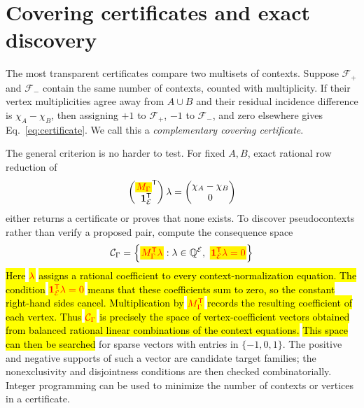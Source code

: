 \documentclass[
  twocolumn,
  aps,
  pra,
  floatfix,
  amsmath,amssymb,
  longbibliography
]{revtex4-2}
\theoremstyle{definition}
\theoremstyle{remark}
\newcommand{\E}{\mathcal E}
\newcommand{\one}{\mathbf 1}
\newcommand{\corr}[1]{{\color{red}\hl{#1}}}
\newcommand{\corrmath}[1]{\begingroup\setlength{\fboxsep}{1pt}\colorbox{yellow}{\ensuremath{\color{red}#1}}\endgroup}
\begin{document}
\section{Covering certificates and exact discovery}
\label{sec:coverings}

The most transparent certificates compare two multisets of contexts.
Suppose $\mathcal F_+$ and $\mathcal F_-$ contain the same number of
contexts, counted with multiplicity.  If their vertex multiplicities agree
away from $A\cup B$ and their residual incidence difference is
$\chi_A-\chi_B$, then assigning $+1$ to $\mathcal F_+$, $-1$ to
$\mathcal F_-$, and zero elsewhere gives Eq.~\eqref{eq:certificate}.  We call
this a \emph{complementary covering certificate}.

The general criterion is no harder to test.  For fixed $A,B$, exact rational
row reduction of
\begin{equation}
 \begin{pmatrix}\corrmath{M_\Gamma}^{\mathsf T}\\ \one_\E^{\mathsf T}\end{pmatrix}\lambda
 =
 \begin{pmatrix}\chi_A-\chi_B\\0\end{pmatrix}
 \label{eq:algorithm}
\end{equation}
either returns a certificate or proves that none exists.  To discover
pseudocontexts rather than verify a proposed pair, compute the consequence
space
\begin{equation}
 \mathcal C_\Gamma
 =\left\{\corrmath{M_\Gamma^{\mathsf T}\lambda}:
          \lambda\in\mathbb Q^{\E},\
          \corrmath{\one_\E^{\mathsf T}\lambda=0}\right\}
 \label{eq:consequence-space}
\end{equation}
\corr{Here} \corrmath{\lambda} \corr{assigns a rational coefficient to every
context-normalization equation.  The condition}
\corrmath{\one_\E^{\mathsf T}\lambda=0}
\corr{means that these coefficients sum to zero, so the constant right-hand
sides cancel.  Multiplication by} \corrmath{M_\Gamma^{\mathsf T}}
\corr{records the resulting coefficient of each vertex.  Thus}
\corrmath{\mathcal C_\Gamma}
\corr{is precisely the space of vertex-coefficient vectors obtained from
balanced rational linear combinations of the context equations.}
\corr{This space can then be searched} for sparse vectors with entries in $\{-1,0,1\}$.  The positive
and negative supports of such a vector are candidate target families; the
nonexclusivity and disjointness conditions are then checked combinatorially.
Integer programming can be used to minimize the number of contexts or
vertices in a certificate.
\end{document}
